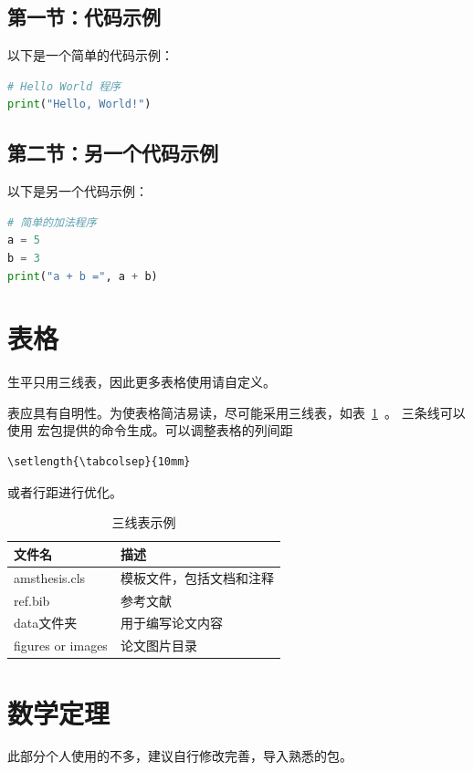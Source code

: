 \subsection{第一节：代码示例}
以下是一个简单的代码示例：

\begin{lstlisting}[language=Python, caption={Hello World 程序}]
# Hello World 程序
print("Hello, World!")
\end{lstlisting}

\subsection{第二节：另一个代码示例}
以下是另一个代码示例：

\begin{lstlisting}[language=Python, caption={简单的加法程序}]
# 简单的加法程序
a = 5
b = 3
print("a + b =", a + b)
\end{lstlisting}

\section{表格}
生平只用三线表，因此更多表格使用请自定义。

\par 表应具有自明性。为使表格简洁易读，尽可能采用三线表，如表~\ref{tab:three-line}~。
三条线可以使用  宏包提供的命令生成。可以调整表格的列间距
\begin{verbatim}\setlength{\tabcolsep}{10mm}
\end{verbatim}或者行距进行优化。
\begin{table}[htb]
  \centering
  \caption{三线表示例}
  \setlength{\tabcolsep}{8mm}     %
  \begin{tabular}{ll}
    \toprule
    文件名             & 描述               \\
    \midrule
    amsthesis.cls   & 模板文件，包括文档和注释   \\
    ref.bib   & 参考文献             \\
    data文件夹 & 用于编写论文内容 \\
    figures or images & 论文图片目录 \\
    \bottomrule
  \end{tabular}
  \label{tab:three-line}
\end{table}


\section{数学定理}
此部分个人使用的不多，建议自行修改完善，导入熟悉的包。

